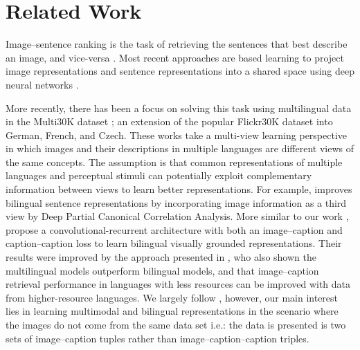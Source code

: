 \section{Related Work}


Image--sentence ranking is the task of retrieving the sentences that best describe an image, and vice-versa \cite{hodosh2013framing}. Most recent approaches are based learning to project image representations and sentence representations into a shared space using deep neural networks \cite[\textit{inter-alia}]{frome2013devise,socher2014grounded,vendrov2016order,faghri2017vse++}. 

More recently, there has been a focus on solving this task using multilingual data \cite{D17-1303,kadar2018conll} in the Multi30K dataset \cite{W16-3210}; an extension of the popular Flickr30K dataset into German, French, and Czech.
These works take a multi-view learning perspective in which 
images and their descriptions in multiple languages are different views of the
same concepts. The assumption is that common representations of multiple languages and perceptual stimuli 
can potentially exploit complementary information
between views to learn better representations. 
For example, \cite{rotman2018bridging} improves bilingual sentence representations by incorporating image information as a third view by Deep Partial Canonical Correlation Analysis.
More similar to our work 
\cite{D17-1303}, propose a convolutional-recurrent architecture with both an image--caption
and caption--caption loss to learn bilingual visually grounded representations. 
Their results were improved by the approach presented in \cite{kadar2018conll}, who also
shown the multilingual models outperform bilingual models, and that image--caption retrieval 
performance in languages with less resources can be improved with data from higher-resource
languages. We largely follow \citet{kadar2018conll}, however, our main interest lies in learning multimodal
and bilingual representations in the scenario where the images do not come from the same
data set i.e.: the data is presented is two sets of image--caption tuples rather than
image--caption--caption triples.

